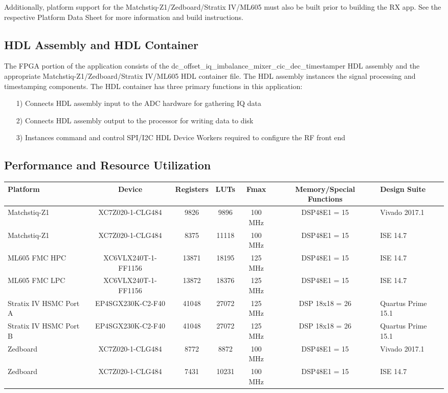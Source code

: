 \documentclass{article}
\begin{document}
\noindent Additionally, platform support for the Matchstiq-Z1/Zedboard/Stratix IV/ML605 must also be built prior to building the RX app. See the respective Platform Data Sheet for more information and build instructions.
\subsection{HDL Assembly and HDL Container}
\noindent The FPGA portion of the application consists of the dc\_offset\_iq\_imbalance\_mixer\_cic\_dec\_timestamper HDL assembly and the appropriate  Matchstiq-Z1/Zedboard/Stratix IV/ML605 HDL container file. The HDL assembly instances the signal processing and timestamping components. The HDL container has three primary functions in this application:
\begin{itemize}
	\item[1)] Connects HDL assembly input to the ADC hardware for gathering IQ data
	\item[2)] Connects HDL assembly output to the processor for writing data to disk
	\item[3)] Instances command and control SPI/I2C HDL Device Workers required to configure the RF front end
\end{itemize}
\subsection{Performance and Resource Utilization}
\begin{scriptsize}
\begin{tabular}{|P{1.8cm}|c|c|c|c|c|P{1.32cm}|}
\hline
{}
Platform               & Device              & Registers & LUTs  & Fmax    & Memory/Special Functions & Design Suite       \\
\hline
Matchstiq-Z1               & XC7Z020-1-CLG484    & 9826     & 9896 & 100 MHz & DSP48E1 = 15             & Vivado 2017.1 \\
\hline
Matchstiq-Z1           & XC7Z020-1-CLG484    & 8375      & 11118 & 100 MHz & DSP48E1 = 15             & ISE 14.7           \\
\hline
ML605 FMC HPC          & XC6VLX240T-1-FF1156 & 13871     & 18195 & 125 MHz & DSP48E1 = 15             & ISE 14.7           \\
\hline
ML605 FMC LPC          & XC6VLX240T-1-FF1156 & 13872     & 18376 & 125 MHz & DSP48E1 = 15             & ISE 14.7           \\
\hline
Stratix IV HSMC Port A & EP4SGX230K-C2-F40   & 41048     & 27072 & 125 MHz & DSP 18x18 = 26           & Quartus Prime 15.1 \\
\hline
Stratix IV HSMC Port B & EP4SGX230K-C2-F40   & 41048     & 27072 & 125 MHz & DSP 18x18 = 26           &  Quartus Prime 15.1 \\
\hline
Zedboard               & XC7Z020-1-CLG484    & 8772     & 8872 & 100 MHz & DSP48E1 = 15             & Vivado 2017.1 \\
\hline
Zedboard               & XC7Z020-1-CLG484    & 7431      & 10231 & 100 MHz & DSP48E1 = 15             & ISE 14.7           \\
\hline
\end{tabular}
\end{scriptsize}
\end{document}
